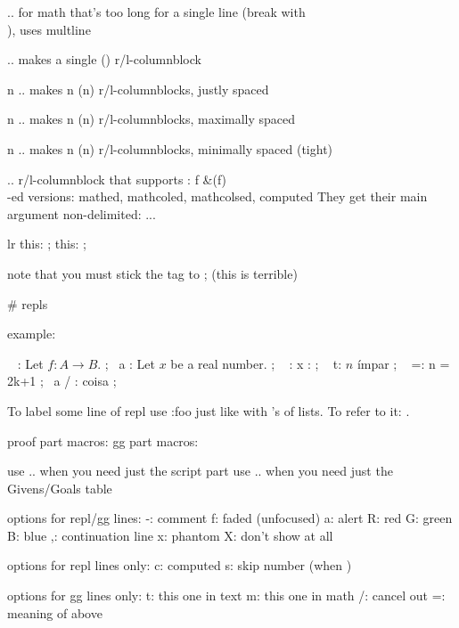 \longmath .. \endlongmath
for math that's too long for a single line (break with \\), uses multline

\mathcol ..\endmathcol
makes a single () r/l-columnblock

\mathcols n .. \endmathcols
makes n (\xalignat n) r/l-columnblocks, justly spaced

\mathxcols n .. \endmathcols
makes n (\xxalignat n) r/l-columnblocks, maximally spaced

\mathtightcols n .. \endmathtightcols
makes n (\alignat n) r/l-columnblocks, minimally spaced (tight)

\mathcall .. \endmathcall
r/l-columnblock that supports \called:
\lfp f & \min(\fixpoints f)   \\

-ed versions: mathed, mathcoled, mathcolsed, computed
They get their main argument non-delimited:
 { ... }

\context lr %
\x this: \reals ;
\x this: \reals \mtag[spot=*];
\endcontext

note that you must stick the \*tag to ;
(this is terrible)


# repls

example:

\repl
~    : Let $f : A \to B$. ;
~a   : Let $x$ be a real number. ;
\givens
~    : x : \Nat ;
~   t: $n$ ímpar ;
~   =:  {n = 2k+1} ;
\goals
~a / : coisa ;
\endrepl

To label some line of repl use  :foo  just like with \li's of lists.
To refer to it: .

proof part macros: \hidenum \shownum
   gg part macros: \intext \inmath

use \replproof .. \endreplproof when you need just the script part
use \repltable .. \endrepltable when you need just the Givens/Goals table

options for repl/gg lines:
  -: comment
  f: faded (unfocused)
  a: alert
  R: red
  G: green
  B: blue
  ,: continuation line
  x: phantom
  X: don't show at all

options for repl lines only:
  c: computed
  s: skip number (when \shownum)

options for gg lines only:
  t: this one in text
  m: this one in math
  /: cancel out
  =: meaning of above

